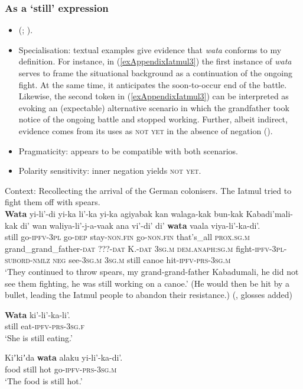 \subsubsection{As a \lq{}still\rq{ }expression}
\begin{itemize}
	\item \citeauthor{Jandraschek2007} (\citeyear[24]{Jandraschek2007}; \citeyear[218, 550]{Jandraschek2012}).
	\item Specialisation: textual examples give evidence that \textit{wata} conforms to my definition. For instance, in (\ref{exAppendixIatmul3}) the first instance of \textit{wata} serves to frame the situational background as a continuation of the ongoing fight. At the same time, it anticipates the soon-to-occur end of the battle. Likewise, the second token in (\ref{exAppendixIatmul3}) can be interpreted as evoking an (expectable) alternative scenario in which the grandfather took notice of the ongoing battle and stopped working. Further, albeit indirect, evidence comes from its uses as \textsc{not yet} in the absence of negation ().
\item Pragmaticity: appears to be compatible with both scenarios.
\item Polarity sensitivity: inner negation yields \textsc{not yet}.
\end{itemize}
\pagebreak
\begin{exe}
	\ex \label{exAppendixIatmulq}
 	Context: Recollecting the arrival of the German colonisers. The Iatmul tried to fight them off with spears.\\
	 \gll \textbf{Wata} yi-li’-di yi-ka li’-ka yi-ka agiyabak kan walaga-kak bun-kak Kabadi’mali-kak di’ wan waliya-li’-j-a-vaak ana vi’-di’ di’ \textbf{wata} vaala viya-li’-ka-di’.\\
 still go-\textsc{ipfv}-3\textsc{pl} go-\textsc{dep} stay-\textsc{non}.\textsc{fin} go-\textsc{non}.\textsc{fin} that's\_all \textsc{prox.sg.m} grand\_grand\_father-\textsc{dat} ???-\textsc{dat} K.-\textsc{dat} 3\textsc{sg.m} \textsc{dem.anaph:sg.m} fight-\textsc{ipfv}-3\textsc{pl}-\textsc{subord}-\textsc{nmlz} \textsc{neg} see-3\textsc{sg.m} 3\textsc{sg.m} still canoe hit-\textsc{ipfv}-\textsc{prs}-3\textsc{sg.m}\\
	\glt \lq They continued to throw spears, my grand-grand-father Kabadumali, he did not see them fighting, he was still working on a canoe.' (He would then be hit by a bullet, leading the Iatmul people to abandon their resistance.) (\cite[54]{Jandraschek2008}, glosses added)

	\ex \label{exAppendixIatmul2}
	 \gll \textbf{Wata} ki'-li'-ka-li'.\\
	still eat-\textsc{ipfv}-\textsc{prs}-3\textsc{sg.f}\\
	\glt \lq She is still eating.' \parencite[218]{Jandraschek2012}

	\ex \label{exAppendixIatmul3}
	 \gll Kiʼkiʼda \textbf{wata} alaku yi-li'-ka-di'.\\
	food still hot go-\textsc{ipfv}-\textsc{prs}-3\textsc{sg.m}\\
	\glt \lq The food is still hot.' \parencite[295]{Jandraschek2012}
\end{exe}

